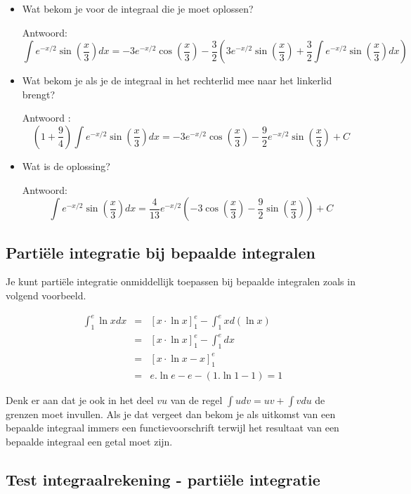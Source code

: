 \begin{enumerate}
\begin{itemize}
		\item Wat bekom je voor de integraal die je moet oplossen?
		
		Antwoord: \begin{equation*}
		\int e^{-x/2}\sin \left( \frac{x}{3}  \right)dx=-3e^{-x/2} \cos \left( \frac{x}{3}  \right)-\frac{3}{2} \left(  3e^{-x/2}\sin \left( \frac{x}{3}  \right)+\frac{3}{2}\int e^{-x/2}\sin \left( \frac{x}{3}  \right)dx \right)
		\end{equation*}
		
		\item Wat bekom je als je de integraal in het rechterlid mee naar het linkerlid brengt?
		
		Antwoord : \begin{equation*}
		\left(  1+\frac{9}{4} \right)\int e^{-x/2}\sin \left( \frac{x}{3}  \right)dx=-3e^{-x/2} \cos \left( \frac{x}{3}  \right)-\frac{9}{2} e^{-x/2}\sin \left( \frac{x}{3}  \right)+C
		\end{equation*}
		
		\item Wat is de oplossing?
		
		Antwoord: 
		\begin{equation*}
		\int e^{-x/2}\sin \left( \frac{x}{3}  \right)dx=\frac{4}{13}e^{-x/2} \left( -3 \cos \left( 	\frac{x}{3}  \right)-\frac{9}{2}\sin \left( \frac{x}{3}  \right) \right)+C
		\end{equation*}
		
	\end{itemize}
	
\end{enumerate}


\subsection{Parti\"ele integratie bij bepaalde integralen}

Je kunt parti\"ele integratie onmiddellijk toepassen bij bepaalde integralen zoals in volgend voorbeeld.

\begin{eqnarray*}
\int ^e_1 \ln x dx &=& \left[ x \cdot \ln x \right] ^e_1- \int ^e_1 x d(\ln x) \\
&=& \left[ x \cdot \ln x \right] ^e_1-\int ^e_1dx \\
&=& \left[ x \cdot \ln x -x \right] ^e_1 \\
&=&
e.\ln e - e - (1.\ln 1 -1)=1
\end{eqnarray*}

Denk er aan dat je ook in het deel $vu$ van de regel $\int udv=uv+\int vdu$ de grenzen moet invullen. Als je dat vergeet dan bekom je als uitkomst van een bepaalde integraal immers een functievoorschrift terwijl het resultaat van een bepaalde integraal een getal moet zijn.


\subsection{Test integraalrekening - parti\"ele integratie}
